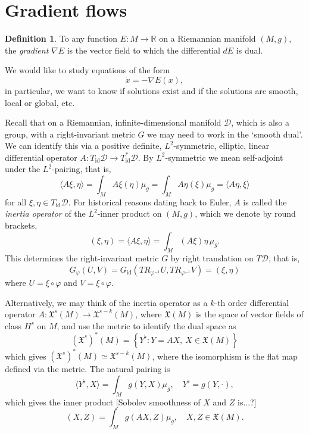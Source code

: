 \documentclass[a5paper,10pt,twoside]{article}
\newcommand{\R}{\ensuremath{\mathbb{R}}}
\newcommand{\cD}{\ensuremath{\mathcal{D}}}
\DeclareMathOperator*{\id}{id}
\theoremstyle{plain}
\theoremstyle{definition}
\newtheorem{defn}[teo]{Definition}
\theoremstyle{remark}
\begin{document}
\section{Gradient flows}

\begin{defn}
	To any function $E:M\to\R$ on a Riemannian manifold $(M,g)$, the \textit{gradient} $\nabla E$ is the  vector field to which  the differential $dE$ is dual.
\end{defn}

We would like to study equations of the form
\[
\dot{x} = -\nabla E(x),
\]
in particular, we want to know if solutions exist and if the solutions are smooth, local or global, etc.


Recall that on a Riemannian, infinite-dimensional manifold $\cD$, which is also a group, with a right-invariant metric $G$ we may need to work in the `smooth dual'. We can identify this via a positive definite, $L^2$-symmetric, elliptic, linear differential operator $A:T_{\id}\cD\to T_{\id}^*\cD.$  By $L^2$-symmetric we mean self-adjoint under the $L^2$-pairing, that is,
%
\begin{equation}
 \langle A\xi,\eta\rangle=\int_M A \xi(\eta)\mu_g=\int_M A\eta(\xi)\mu_g = \langle A\eta,\xi\rangle
\end{equation}
%
for all $\xi,\eta\in T_{\id}\cD.$ 
For historical reasons dating back to Euler, $A$ is called the \textit{inertia operator} of the $L^2$-inner product on $(M,g)$, which we denote by round brackets,
%
\begin{equation} 
\label{def:A-product}
(\xi,\eta)=\langle A\xi,\eta\rangle=\int_M (A \xi)\eta\,\mu_g.
\end{equation}
%
This determines the right-invariant metric $G$ by right translation on $T\cD$, that is, 
%
\begin{equation} 
\label{weak-A-metric}
G_\varphi(U,V)=G_{\id}(TR_{\varphi^{-1}}U,TR_{\varphi^{-1}}V)=(\xi,\eta)
\end{equation}
%
where $U=\xi\circ\varphi$ and $V=\xi\circ\varphi$.

Alternatively, we may think of the inertia operator as a $k$-th order differential operator $A:\mathfrak{X}^s(M)\to\mathfrak{X}^{s-k}(M)$, where $\mathfrak{X}(M)$ is the space of vector fields of class $H^s$ on $M$, and use the metric to identify the dual space as 
%
\begin{equation}
 (\mathfrak{X}^s)^*(M)=\left\{Y^\flat: Y=AX,\ X\in\mathfrak{X}(M) \right\}
\end{equation}
%
which gives $(\mathfrak{X}^s)^*(M) \simeq  \mathfrak{X}^{s-k}(M)$, where the isomorphism is the flat map defined via the metric. The natural pairing is
%
\begin{equation}
\langle Y^\flat,X\rangle = \int_M g(Y,X)\mu_g,\quad Y^\flat=g(Y,\cdot),
\end{equation}
%
which gives the inner product [Sobolev smoothness of $X$ and $Z$ is...?]
%
\begin{equation}
(X,Z)=\int_M g(AX,Z)\mu_g,\quad X,Z\in\mathfrak{X}(M).
\end{equation}
%
\end{document}
